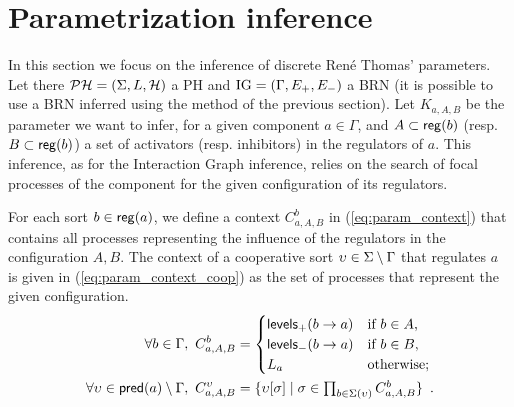 \section{Parametrization inference}



In this section we focus on the inference of discrete René Thomas' parameters.
Let there $\mathcal{PH} = (\Sigma,L,\mathcal{H})$ a PH and $\mathrm{IG} = (\Gamma,E_+,E_-)$ a BRN (it is possible to use a BRN inferred using the method of the previous section).
Let $K_{a,A,B}$ be the parameter we want to infer, for a given component $a \in \Gamma$, and $A
\subset \mathsf{reg}({b})$ (resp. $B \subset \mathsf{reg}({b})$) a set of activators (resp.
inhibitors) in the regulators of $a$. This inference, as for the Interaction Graph inference, relies
on the search of focal processes of the component for the given configuration of its regulators.

For each sort $b \in \mathsf{reg}({a})$, we define a context $C^b_{a,A,B}$ in
(\ref{eq:param_context}) that contains all processes representing the influence of the regulators in
the configuration $A,B$. The context of a cooperative sort $\upsilon \in \Sigma\setminus\Gamma$ that
regulates $a$ is given in (\ref{eq:param_context_coop}) as the set of processes that represent the
given configuration.
\begin{align}
\label{eq:param_context}
\forall b\in\Gamma,~
C_{a,A,B}^b & = \begin{cases}
\mathsf{levels}_+(b\rightarrow a) & \text{if $b \in A$,}\\
\mathsf{levels}_-(b\rightarrow a) & \text{if $b \in B$,}\\
L_a		& \text{otherwise;}\\
\end{cases}
\\
\label{eq:param_context_coop}
\forall \upsilon \in \mathsf{pred}(a)\setminus\Gamma,~
C_{a,A,B}^\upsilon & = \{
\upsilon[\sigma] \mid \sigma \in \textstyle\prod_{b \in \Sigma(\upsilon)}C_{a,A,B}^b \}
\enspace.
\end{align}

